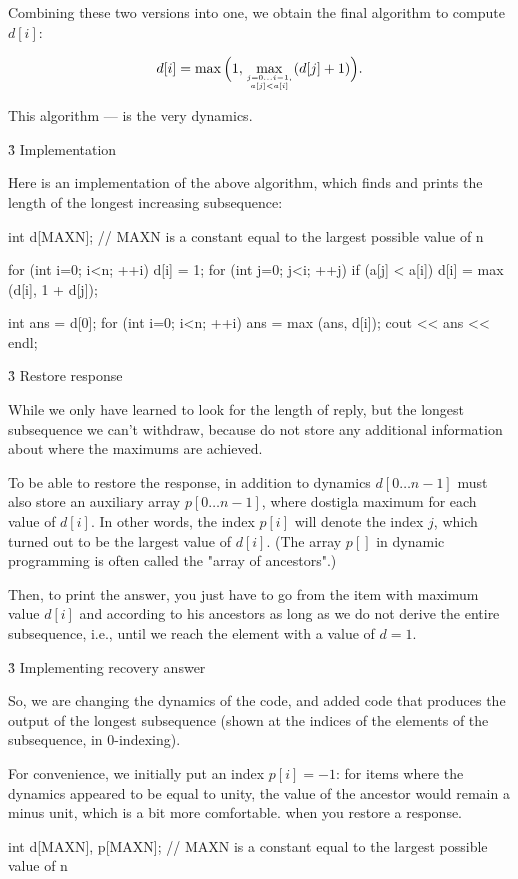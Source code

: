 Combining these two versions into one, we obtain the final algorithm to compute $d[i]$:

$$ d[i] = \max \Big( 1, \max_{j=0 \ldots i-1, \atop a[j] < a[i]} ( d[j] + 1 ) \Big). $$

This algorithm --- is the very dynamics.


\h3{ Implementation }

Here is an implementation of the above algorithm, which finds and prints the length of the longest increasing subsequence:

\code
int d[MAXN]; // MAXN is a constant equal to the largest possible value of n

for (int i=0; i<n; ++i) {
d[i] = 1;
for (int j=0; j<i; ++j)
if (a[j] < a[i])
d[i] = max (d[i], 1 + d[j]);
}

int ans = d[0];
for (int i=0; i<n; ++i)
ans = max (ans, d[i]);
cout << ans << endl;
\endcode


\h3{ Restore response }

While we only have learned to look for the length of reply, but the longest subsequence we can't withdraw, because do not store any additional information about where the maximums are achieved.

To be able to restore the response, in addition to dynamics $d[0 \ldots n-1]$ must also store an auxiliary array $p[0 \ldots n-1]$, where dostigla maximum for each value of $d[i]$. In other words, the index $p[i]$ will denote the index $j$, which turned out to be the largest value of $d[i]$. (The array $p[]$ in dynamic programming is often called the "array of ancestors".)

Then, to print the answer, you just have to go from the item with maximum value $d[i]$ and according to his ancestors as long as we do not derive the entire subsequence, i.e., until we reach the element with a value of $d = 1$.


\h3{ Implementing recovery answer }

So, we are changing the dynamics of the code, and added code that produces the output of the longest subsequence (shown at the indices of the elements of the subsequence, in 0-indexing).

For convenience, we initially put an index $p[i] = -1$: for items where the dynamics appeared to be equal to unity, the value of the ancestor would remain a minus unit, which is a bit more comfortable. when you restore a response.

\code
int d[MAXN], p[MAXN]; // MAXN is a constant equal to the largest possible value of n

